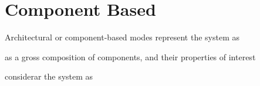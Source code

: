 \section{Component Based}

Architectural or component-based modes represent the system as

as a gross composition of components, and their properties of interest\cite{garlan_rainbow:_2004}

considerar the system as
